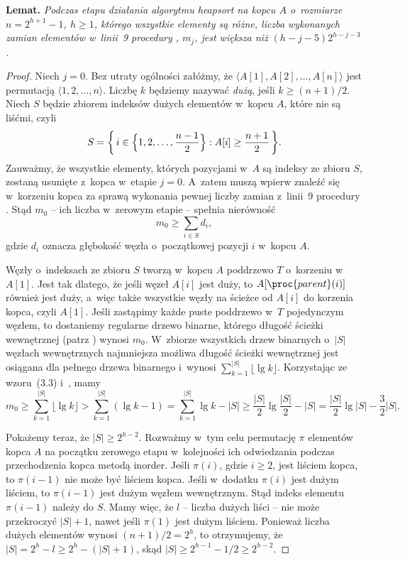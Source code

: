 \medskip
\noindent\textsf{\textbf{Lemat.}} \textit{Podczas\/  etapu działania algorytmu heapsort na kopcu\/ $A$ o~rozmiarze\/ $n=2^{h+1}-1$,\/ $h\ge1$, którego wszystkie elementy są różne, liczba wykonanych zamian elementów w~linii~9 procedury ,\/ $m_j$, jest większa niż\/ $(h-j-5)2^{h-j-3}$.}
\begin{proof}
Niech $j=0$. Bez utraty ogólności załóżmy, że $\langle A[1],A[2],\dots,A[n]\rangle$ jest permutacją $\langle1,2,\dots,n\rangle$. Liczbę $k$ będziemy nazywać \emph{dużą}, jeśli $k\ge(n+1)/2$. Niech $S$ będzie zbiorem indeksów dużych elementów w~kopcu $A$, które nie są liśćmi, czyli
\[
    S = \biggl\{\,i\in\Bigl\{1,2,\dots,\frac{n-1}{2}\Bigr\}:A[i]\ge\frac{n+1}{2}\,\biggr\}.
\]
Zauważmy, że wszystkie elementy, których pozycjami w~$A$ są indeksy ze zbioru $S$, zostaną usunięte z~kopca w~etapie $j=0$. A~zatem muszą wpierw znaleźć się w~korzeniu kopca za sprawą wykonania pewnej liczby zamian z~linii~9 procedury . Stąd $m_0$ -- ich liczba w~zerowym etapie -- spełnia nierówność
\[
    m_0 \ge \sum_{i\in S}d_i,
\]
gdzie $d_i$ oznacza głębokość węzła o~początkowej pozycji $i$ w~kopcu $A$.

Węzły o~indeksach ze zbioru $S$ tworzą w~kopcu $A$ poddrzewo $T$ o~korzeniu w~$A[1]$. Jest tak dlatego, że jeśli węzeł $A[i]$ jest duży, to $A[\proc{parent}(i)]$ również jest duży, a~więc także wszystkie węzły na ścieżce od $A[i]$ do korzenia kopca, czyli $A[1]$. Jeśli zastąpimy każde puste poddrzewo w~$T$ pojedynczym węzłem, to dostaniemy regularne drzewo binarne, którego długość ścieżki wewnętrznej (patrz ) wynosi $m_0$. W~zbiorze wszystkich drzew binarnych o~$|S|$ węzłach wewnętrznych najmniejsza możliwa długość ścieżki wewnętrznej jest osiągana dla pełnego drzewa binarnego i~wynosi $\sum_{k=1}^{|S|}\lfloor\lg k\rfloor$. Korzystając ze wzoru~(3.3) i~, mamy
\[
    m_0 \ge \sum_{k=1}^{|S|}\lfloor\lg k\rfloor > \sum_{k=1}^{|S|}(\lg k-1) = \sum_{k=1}^{|S|}\lg k-|S| \ge \frac{|S|}{2}\lg\frac{|S|}{2}-|S| = \frac{|S|}{2}\lg|S|-\frac{3}{2}|S|.
\]

Pokażemy teraz, że $|S|\ge2^{h-2}$. Rozważmy w~tym celu permutację $\pi$ elementów kopca $A$ na początku zerowego etapu w~kolejności ich odwiedzania podczas przechodzenia kopca metodą inorder. Jeśli $\pi(i)$, gdzie $i\ge2$, jest liściem kopca, to $\pi(i-1)$ nie może być liściem kopca. Jeśli w~dodatku $\pi(i)$ jest dużym liściem, to $\pi(i-1)$ jest dużym węzłem wewnętrznym. Stąd indeks elementu $\pi(i-1)$ należy do $S$. Mamy więc, że $l$ -- liczba dużych liści -- nie może przekroczyć $|S|+1$, nawet jeśli $\pi(1)$ jest dużym liściem. Ponieważ liczba dużych elementów wynosi $(n+1)/2=2^h$, to otrzymujemy, że $|S|=2^h-l\ge2^h-(|S|+1)$, skąd $|S|\ge2^{h-1}-1/2\ge2^{h-2}$.


\end{proof}
